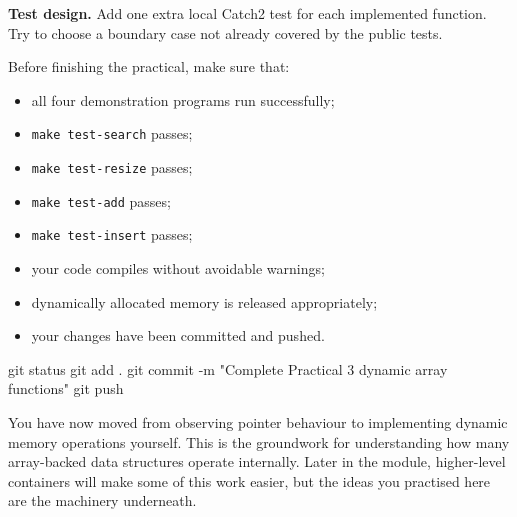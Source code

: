 \documentclass{csc2059practical}
\begin{document}
\begin{challengebox}
\textbf{Test design.} Add one extra local Catch2 test for each implemented function. Try to choose a boundary case not already covered by the public tests.
\end{challengebox}


Before finishing the practical, make sure that:

\begin{itemize}
  \item all four demonstration programs run successfully;
  \item \texttt{make test-search} passes;
  \item \texttt{make test-resize} passes;
  \item \texttt{make test-add} passes;
  \item \texttt{make test-insert} passes;
  \item your code compiles without avoidable warnings;
  \item dynamically allocated memory is released appropriately;
  \item your changes have been committed and pushed.
\end{itemize}

\begin{bashcode}
git status
git add .
git commit -m "Complete Practical 3 dynamic array functions"
git push
\end{bashcode}

\begin{wrapupbox}
You have now moved from observing pointer behaviour to implementing dynamic memory operations yourself. This is the groundwork for understanding how many array-backed data structures operate internally. Later in the module, higher-level containers will make some of this work easier, but the ideas you practised here are the machinery underneath.
\end{wrapupbox}
\end{document}
